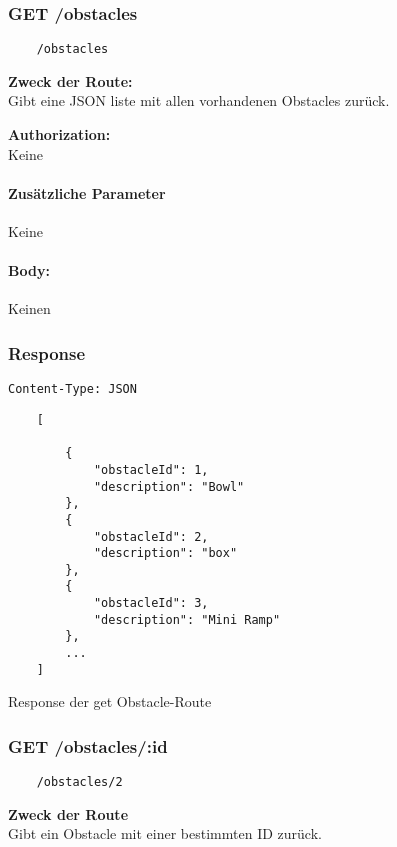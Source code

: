 \label{/obstacles}

\subsubsection{GET /obstacles}

\begin{lstlisting}
    /obstacles
\end{lstlisting}

\textbf{Zweck der Route:} \\
Gibt  eine JSON liste mit allen vorhandenen Obstacles zurück.

\textbf{Authorization:} \\
Keine

\paragraph{Zusätzliche Parameter}
Keine

\paragraph{Body:}

Keinen

\subsubsection{Response}
\begin{code}
    \lstinline{Content-Type: JSON}
    \begin{lstlisting}
    [
            
        {
            "obstacleId": 1,
            "description": "Bowl"
        },
        {
            "obstacleId": 2,
            "description": "box"
        },
        {
            "obstacleId": 3,
            "description": "Mini Ramp"
        },
        ...
    ]
    \end{lstlisting}
    \caption{Response der get Obstacle-Route}
\end{code}

\pagebreak

\subsubsection{GET /obstacles/:id}

\begin{lstlisting}
    /obstacles/2
\end{lstlisting}

\textbf{Zweck der Route} \\
Gibt ein Obstacle mit einer bestimmten ID zurück.


